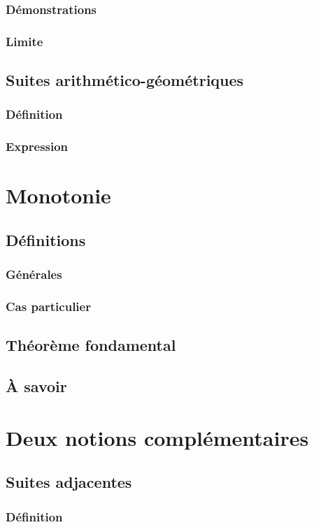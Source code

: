 \documentclass[12pt,a4paper,french]{book}
\begin{document}
			\subsubsection{Démonstrations}
			\subsubsection{Limite}
		\subsection{Suites arithmético-géométriques}
			\subsubsection{Définition}
			\subsubsection{Expression}
	\section{Monotonie}
		\subsection{Définitions}
			\subsubsection{Générales}
			\subsubsection{Cas particulier}
		\subsection{Théorème fondamental}
		\subsection{À savoir}
	\section{Deux notions complémentaires}
		\subsection{Suites adjacentes}
			\subsubsection{Définition}
\end{document}
